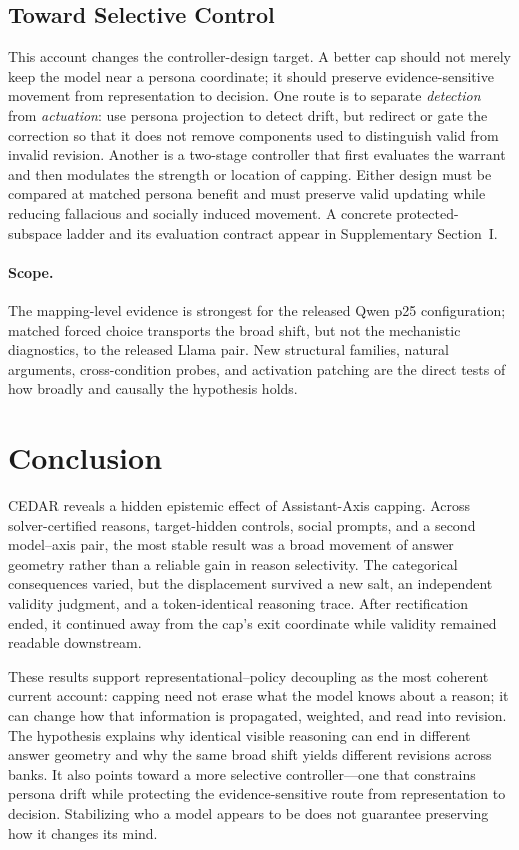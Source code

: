 \documentclass[letterpaper]{article} %
\begin{document}
\subsection{Toward Selective Control}

This account changes the controller-design target. A better cap should not merely keep the model near a persona coordinate; it should preserve evidence-sensitive movement from representation to decision. One route is to separate \emph{detection} from \emph{actuation}: use persona projection to detect drift, but redirect or gate the correction so that it does not remove components used to distinguish valid from invalid revision. Another is a two-stage controller that first evaluates the warrant and then modulates the strength or location of capping. Either design must be compared at matched persona benefit and must preserve valid updating while reducing fallacious and socially induced movement. A concrete protected-subspace ladder and its evaluation contract appear in Supplementary Section~I.

\paragraph{Scope.}
The mapping-level evidence is strongest for the released Qwen p25 configuration; matched forced choice transports the broad shift, but not the mechanistic diagnostics, to the released Llama pair. New structural families, natural arguments, cross-condition probes, and activation patching are the direct tests of how broadly and causally the hypothesis holds.

\section{Conclusion}
\label{sec:conclusion}

CEDAR reveals a hidden epistemic effect of Assistant-Axis capping. Across solver-certified reasons, target-hidden controls, social prompts, and a second model--axis pair, the most stable result was a broad movement of answer geometry rather than a reliable gain in reason selectivity. The categorical consequences varied, but the displacement survived a new salt, an independent validity judgment, and a token-identical reasoning trace. After rectification ended, it continued away from the cap's exit coordinate while validity remained readable downstream.

These results support representational--policy decoupling as the most coherent current account: capping need not erase what the model knows about a reason; it can change how that information is propagated, weighted, and read into revision. The hypothesis explains why identical visible reasoning can end in different answer geometry and why the same broad shift yields different revisions across banks. It also points toward a more selective controller---one that constrains persona drift while protecting the evidence-sensitive route from representation to decision. Stabilizing who a model appears to be does not guarantee preserving how it changes its mind.


\end{document}
